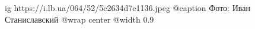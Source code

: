  
 
 
 
 

\ifcmt
  ig https://i.lb.ua/064/52/5c2634d7e1136.jpeg
	@caption Фото: Иван Станиславский
  @wrap center
  @width 0.9
\fi
